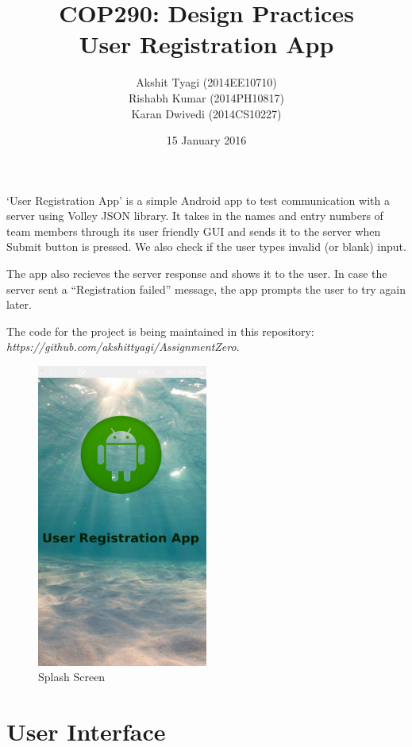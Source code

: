 \documentclass[12pt,a4paper,titlepage]{article}
\title{COP290: Design Practices\break\\User Registration App}
\author{Akshit Tyagi (2014EE10710) \\ Rishabh Kumar (2014PH10817) \\ Karan Dwivedi (2014CS10227) }
\date{15 January 2016}
\begin{document}
\maketitle

`User Registration App' is a simple Android app to test communication with a server using Volley JSON library. It takes in the names and entry numbers of team members through its user friendly GUI and sends it to the server when Submit button is pressed. We also check if the user types invalid (or blank) input.

The app also recieves the server response and shows it to the user. In case the server sent a ``Registration failed'' message, the app prompts the user to try again later.

The code for the project is being maintained in this repository:\\ {\em https://github.com/akshittyagi/AssignmentZero}.

\begin{figure}[!ht]
	\centering
	\includegraphics[width=0.5\textwidth]{./UserInterface}
	\caption{Splash Screen}
\end{figure}

\section{User Interface}
\end{document}
